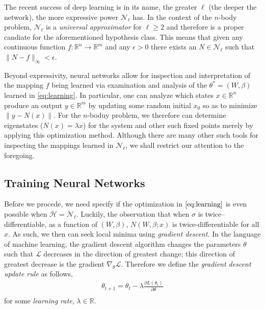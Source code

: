 \documentclass{article}
\numberwithin{theorem}{section}
\numberwithin{equation}{section}
\def\scripth{{\mathcal H}}
\def\scriptl{{\mathcal L}}
\def\scriptn{{\mathcal N}}
\begin{document}
The recent success of deep learning is in its name, the greater $\ell$ (the deeper the network), the more expressive power $\scriptn_\ell$ has. In the context of the $n$-body problem, $\scriptn_\ell$ is a \emph{universal approximator} for $\ell \geq 2$ and therefore is a proper candiate for the aforementioned hypothesis class. This means that given any continuous function $f: \mathbb{R}^n \to \mathbb{R}^m$ and any $\epsilon > 0$ there exists an $N \in \scriptn_\ell$ such that $\|N - f\|_\infty < \epsilon.$ 

Beyond expressivity, neural networks allow for inspection and interpretation of the mapping $f$ being learned via examination and analysis of the $\theta^* = (W, \beta)$ learned in \eqref{eq:learning}. In particular, one can analyze which states $x \in \mathbb{R}^n$ produce an output $y \in \mathbb{R}^m$ by updating some random initial $x_0$ so as to minimize $\|y - N(x)\|$. For the $n$-boduy problem, we therefore can determine eigenstates ($N(x) = \lambda x$) for the system and other such fixed points merely by applying this optimization method. Although there are many other such tools for inspecting the mappings learned in $\scriptn_\ell$, we shall restrict our attention to the foregoing.

\subsection{Training Neural Networks} Before we procede, we need specify if the optimization in $\eqref{eq:learning}$ is even possible when $\scripth = \scriptn_\ell$. Luckily, the observation that when $\sigma$ is twice--differentiable, as a function of $(W, \beta)$, $N(W,\beta; x)$ is twice-differentiable for all $x.$ As such, we then can seek local minima using \emph{gradient descent.} In the language of machine learning, the gradient descent algorithm changes the parameters $\theta$ such that $\scriptl$ decreases in the direction of greatest change; this direction of greatest decrease is the gradient $\nabla_\theta \scriptl.$ Therefore we define the \emph{gradient descent update rule} as follows,
\begin{equation}\label{eq:gradientdescent}
\begin{aligned}
	\theta_{t+1} = \theta_t - \lambda\frac{\partial L(\theta_t)}{\partial \theta} \\
\end{aligned}
\end{equation}
for some \emph{learning rate}, $\lambda \in \mathbb{R}.$ 
\end{document}
